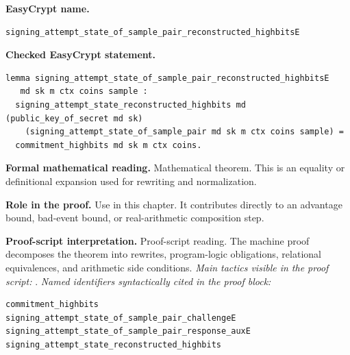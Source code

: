 \begin{formaltheorem}
\noindent\textbf{EasyCrypt name.}
\begin{lstlisting}[language=EasyCrypt,basicstyle=\ttfamily\scriptsize]
signing_attempt_state_of_sample_pair_reconstructed_highbitsE
\end{lstlisting}
\noindent\textbf{Checked EasyCrypt statement.}
\begin{lstlisting}[language=EasyCrypt,basicstyle=\ttfamily\scriptsize]
lemma signing_attempt_state_of_sample_pair_reconstructed_highbitsE
   md sk m ctx coins sample :
  signing_attempt_state_reconstructed_highbits md (public_key_of_secret md sk)
    (signing_attempt_state_of_sample_pair md sk m ctx coins sample) =
  commitment_highbits md sk m ctx coins.
\end{lstlisting}
\noindent\textbf{Formal mathematical reading.}
Mathematical theorem. This is an equality or definitional expansion used for rewriting and normalization.

\noindent\textbf{Role in the proof.}
Use in this chapter. It contributes directly to an advantage bound, bad-event bound, or real-arithmetic composition step.

\noindent\textbf{Proof-script interpretation.}
Proof-script reading. The machine proof decomposes the theorem into rewrites, program-logic obligations, relational equivalences, and arithmetic side conditions.
\emph{Main tactics visible in the proof script:} .
\emph{Named identifiers syntactically cited in the proof block:}
\begin{lstlisting}[language=EasyCrypt,basicstyle=\ttfamily\scriptsize]
commitment_highbits
signing_attempt_state_of_sample_pair_challengeE
signing_attempt_state_of_sample_pair_response_auxE
signing_attempt_state_reconstructed_highbits
\end{lstlisting}

\end{formaltheorem}


